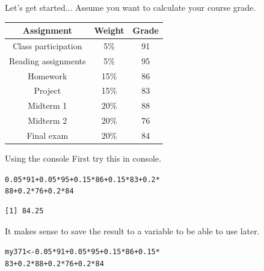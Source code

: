 \documentclass{beamer}\usepackage[]{graphicx}\usepackage[]{color}
\makeatletter
\newcommand{\hlnum}[1]{\textcolor[rgb]{0.824,0.412,0.118}{#1}}%
\newcommand{\hlopt}[1]{\textcolor[rgb]{1,0.894,0.769}{#1}}%
\newcommand{\hlstd}[1]{\textcolor[rgb]{1,0.894,0.769}{#1}}%
\newcommand{\hlkwb}[1]{\textcolor[rgb]{0.804,0.776,0.451}{#1}}%
\newenvironment{kframe}{%
 \def\at@end@of@kframe{}%
 \ifinner\ifhmode%
  \def\at@end@of@kframe{\end{minipage}}%
  \begin{minipage}{\columnwidth}%
 \fi\fi%
 \def\FrameCommand##1{\hskip\@totalleftmargin \hskip-\fboxsep
 \colorbox{shadecolor}{##1}\hskip-\fboxsep
     \hskip-\linewidth \hskip-\@totalleftmargin \hskip\columnwidth}%
 \MakeFramed {\advance\hsize-\width
   \@totalleftmargin\z@ \linewidth\hsize
   \@setminipage}}%
 {\par\unskip\endMakeFramed%
 \at@end@of@kframe}
\newenvironment{knitrout}{}{} %
\makeatother
\begin{document}
\begin{darkframes}
    
    
    
    \begin{frame}{Let's get started...}
    \fontsize{10}{10}\selectfont
    Assume you want to calculate your course grade.
    
      \begin{table}[!b]
        {\carlitoTLF %
        \begin{tabularx}{\textwidth}{ccc}
           
           Assignment & Weight  & Grade \\ 
          \toprule
            Class participation & 5\%	&	91  \\
            Reading assignments & 5\%	&	95  \\
            Homework    & 15\%	&	 86 \\
            Project     & 15\%	&	 83 \\
            Midterm 1   & 20\%	&	 88 \\
            Midterm 2   & 20\%	&	 76 \\
            Final exam  & 20\%	&	 84 \\
        \end{tabularx}}
        
      \end{table} 
    \end{frame}


    \begin{frame}[fragile]{Using the console}
      First try this in console.
\begin{knitrout}
\begin{kframe}
\begin{alltt}
\hlnum{0.05} \hlopt{*} \hlnum{91} \hlopt{+} \hlnum{0.05} \hlopt{*} \hlnum{95} \hlopt{+} \hlnum{0.15} \hlopt{*} \hlnum{86} \hlopt{+} \hlnum{0.15} \hlopt{*} \hlnum{83} \hlopt{+} \hlnum{0.2} \hlopt{*}
    \hlnum{88} \hlopt{+} \hlnum{0.2} \hlopt{*} \hlnum{76} \hlopt{+} \hlnum{0.2} \hlopt{*} \hlnum{84}
\end{alltt}
\begin{verbatim}
[1] 84.25
\end{verbatim}
\end{kframe}
\end{knitrout}
      \pause
      It makes sense to save the result to a variable to be able to use later.
\begin{knitrout}
\begin{kframe}
\begin{alltt}
\hlstd{my371} \hlkwb{<-} \hlnum{0.05} \hlopt{*} \hlnum{91} \hlopt{+} \hlnum{0.05} \hlopt{*} \hlnum{95} \hlopt{+} \hlnum{0.15} \hlopt{*} \hlnum{86} \hlopt{+} \hlnum{0.15} \hlopt{*}
    \hlnum{83} \hlopt{+} \hlnum{0.2} \hlopt{*} \hlnum{88} \hlopt{+} \hlnum{0.2} \hlopt{*} \hlnum{76} \hlopt{+} \hlnum{0.2} \hlopt{*} \hlnum{84}
\end{alltt}
\end{kframe}
\end{knitrout}
    \end{frame}




\end{darkframes}
\end{document}
